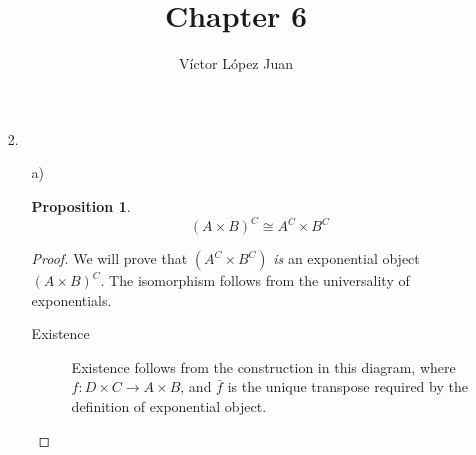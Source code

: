 \documentclass[a4paper,notitlepage]{article}
\author{Víctor López Juan}
\title{Chapter 6}
\newtheorem{proposition}{Proposition}
\begin{document}
\maketitle

\begin{enumerate}
     
   \item[ 2.]

     \begin{enumerate}

       \item[a)]

         \begin{proposition}
           
         $$(A \times B)^C \cong A^C \times B^C$$

         \end{proposition}

         \begin{proof}

           We will prove that $(A^C \times B^C)$ {\em is} an exponential
           object $(A \times B)^C$. The isomorphism follows from the
           universality of exponentials.

           \begin{description}
             
             \item[Existence]
               
               Existence follows from the construction in this
               diagram, where $f : D \times C → A \times B$, and
               $\bar{f}$ is the unique transpose required by the definition
               of exponential object.

\end{description}
\end{proof}
\end{enumerate}
\end{enumerate}
\end{document}
